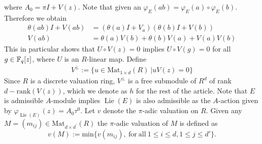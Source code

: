 \documentclass{amsart}
\numberwithin {equation}{section}
\DeclareMathOperator{\Lie}{\mathrm{Lie}}
\begin{document}
 where $A_{0}=\pi I+V(z)$. Note that given an  $\varphi_{E}(ab)=\varphi_{E}(a)\circ \varphi_{E}(b)$. Therefore we obtain
\begin{align}\label{V-id}
\nonumber \theta(ab)I+V(ab)&=(\theta(a)I+V_{a})(\theta(b)I+V(b))\\
V(ab)&=\theta(a)V(b)+\theta(b)V(a)+V(a)V(b)
\end{align}
This in particular shows that $U \circ V(z)=0$ implies $U \circ V(g)=0$ for all $g\in \mathbb{F}_{q}[z]$, where $U$ is an $R$-linear map. Define 
\begin{align*}
	V^{\perp}:=\{u\in \mathrm{Mat}_{1\times d}(R)~| uV(z)=0\}
\end{align*}
Since $R$ is a discrete valuation ring, $V^{\perp}$ is a free submodule of $R^{d}$ of rank $d-\mathrm{rank}(V(z))$, which we denote as $h$ for the rest of the article.	
Note that $E$ is admissible $A$-module implies $\Lie (E)$ is also admissible as the $A$-action given by $\varphi_{\Lie (E)}(z)=A_{0}{\tau}^{0}.$ \cblue 
Let $v$ denote the $\pi$-adic valuation on $R$. Given any $M=(m_{ij})\in \mathrm{Mat}_{d\times d^{'}}(R)$  the $\pi$-adic valuation of $M$ is defined as $$v(M):=\mathrm{min}\{v(m_{ij}), \ \mathrm{for \ all} \ 1\leq i\leq d,1\leq j\leq d' \}.$$\color{black}
\end{document}
